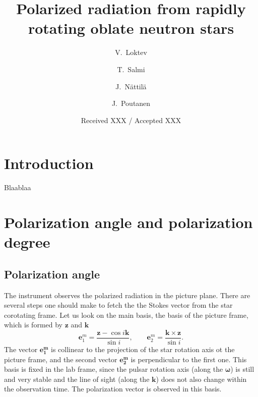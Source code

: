 \documentclass{aa}
\newcommand{\be}{\begin{equation}}
\newcommand{\ee}{\end{equation}}
\begin{document}
\title{Polarized radiation from rapidly rotating oblate neutron stars}


\author{V.~Loktev
\and T.~Salmi
\and J.~N\"attil\"a
\and  J.~Poutanen}


\date{Received XXX / Accepted XXX}







\maketitle

\section{Introduction}\label{sec:intro}
Blaablaa

\section{Polarization angle and polarization degree}
\subsection{Polarization angle }

The instrument observes the polarized radiation in the picture plane.
There are several steps one should make to fetch the the Stokes vector from the star corotating frame.
Let us look on the main basis, the basis of the picture frame, which is formed by $\bm z$ and $\bm k$ 
\be 
\label{mbasis}
\bm{e}_1^m = \frac{\bm{z}-\cos{i} \bm{k}}{\sin{i}},\qquad 
\bm{e}_2^m = \frac{\bm{k} \times \bm{z}}{\sin{i}}.
\ee
The vector  $\bm{e_1^m}$ is collinear to the projection of the star rotation axis ot the picture frame, and the second  vector  $\bm{e_2^m}$ is perpendicular to the first one.
This basis is fixed in the lab frame, since the pulsar rotation  axis (along the $\bm \omega$) is still and very stable and the line of sight (along the  $\bm{k}$) does not also change within the observation time.
The polarization vector is observed in this basis.
\end{document}
